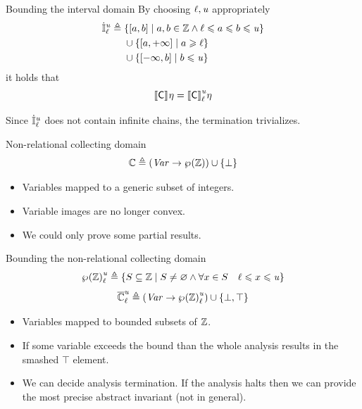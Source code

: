 \documentclass[presentation]{beamer}
\begin{document}
\begin{frame}[label={sec:orgd092f92}]{Bounding the interval domain}
By choosing \({\ell},{\mathit{u}}\) appropriately
\begin{align*}
  {\ensuremath{\dot{\mathbb{I}}}}_{{\ell}}^{{\mathit{u}}} \triangleq & \; \{[a,b] \mid a,b\in\mathbb{Z} \land {\ell} \leqslant a \leqslant b \leqslant {\mathit{u}}\} \\
  & \; \cup \{[a,+\infty] \mid a \geqslant {\ell}\} \\
  & \; \cup \{[-\infty,b] \mid b \leqslant {\mathit{u}}\}
\end{align*}
it holds that
\begin{equation*}
  {{\ensuremath{\llbracket}\ensuremath{\mathsf{C}} \ensuremath{\rrbracket}}^{}}\eta = {{\llbracket \mathsf{C} \rrbracket}_{{\ell}}^{{\mathit{u}}}}\eta
\end{equation*}

Since \({\dot{\mathbb{I}}}_{{\ell}}^{{\mathit{u}}}\) does not contain infinite chains, the
termination trivializes.
\end{frame}
\begin{frame}[label={sec:orgaa0cd87}]{Non-relational collecting domain}
\begin{equation*}
  \mathbb{C} \triangleq (\mathit{Var} \to \wp^{}({\mathbb{Z}})) \cup \{\bot\}
\end{equation*}
\begin{itemize}
\item Variables mapped to a generic subset of integers.
\item Variable images are no longer convex.
\item We could only prove some partial results.
\end{itemize}
\end{frame}
\begin{frame}[label={sec:org7201876}]{Bounding the non-relational collecting domain}
\begin{equation*}
      {\ensuremath{\wp^{}({\mathbb{Z}})}}^{{\mathit{u}}}_{{\ell}} \triangleq \{S \subseteq \mathbb{Z} \mid S \neq \varnothing \land \forall x \in S \quad {\ell} \leqslant x \leqslant {\mathit{u}}\}
\end{equation*}
\begin{equation*}
  {\overline{\mathbb{C}}}_{{\ell}}^{{\mathit{u}}} \triangleq (\mathit{Var} \to {\ensuremath{\wp^{}({\mathbb{Z}})}}^{{\mathit{u}}}_{{\ell}}) \cup \{\bot, \top\}
\end{equation*}
\begin{itemize}
\item Variables mapped to bounded subsets of \(\mathbb{Z}\).
\item If some variable exceeds the bound than the whole analysis
results in the smashed \(\top\) element.
\item We can decide analysis termination. If the analysis halts then we
can provide the most precise abstract invariant (not in general).
\end{itemize}
\end{frame}
\end{document}
